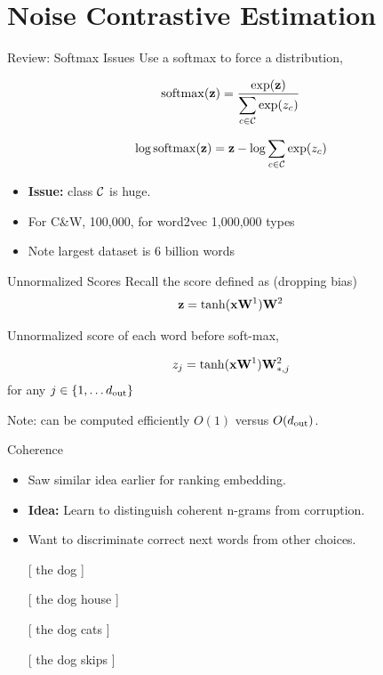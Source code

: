 \documentclass{beamer}
\begin{document}
\section{Noise Contrastive Estimation}

\begin{frame}{Review: Softmax Issues}
  Use a softmax to force a distribution,

  \[\softmax(\boldz) = \frac{\exp(\boldz)}{\displaystyle \sum_{c\in \mcC } \exp(z_c)}  \]

  \[\log \softmax(\boldz) = \boldz - \log \sum_{c\in \mcC} \exp(z_c)  \]

  \begin{itemize}
  \item \textbf{Issue:} class $\mathcal{C}$ is huge.
  \item For C\&W, 100,000, for word2vec 1,000,000 types
  \item Note largest dataset is 6 billion words
  \end{itemize}

\end{frame}



\begin{frame}{Unnormalized Scores}
  Recall the score defined as (dropping bias) 
  \[ \mathbf{z} = \tanh(\mathbf{x} \mathbf{W}^1)\mathbf{W}^2  \] 

  Unnormalized score of each word before soft-max, 

  \[ z_j = \tanh(\mathbf{x} \mathbf{W}^1)\mathbf{W}^2_{*,j}  \] 
  for any  $j \in \{1, \ldots {d_{\mathrm{out}}}\}$
  \air 

  Note: can be computed efficiently $O(1)$ versus $O({d_{\mathrm{out}}})$. 
\end{frame}


\begin{frame}{Coherence }
  \begin{itemize}
  \item Saw similar idea earlier for ranking embedding. 
    \air 

  \item \textbf{Idea:} Learn to distinguish coherent n-grams from 
    corruption. 
    \air 
 

    \air
  \item Want to discriminate correct next words from other choices.

    \begin{center}
      [ the dog  ]
    \end{center}
    
    
    

    \begin {center}
      [ the dog \alert{house}  ]
      
      [ the dog \alert{cats}  ]
      
      [ the dog \alert{skips}  ]
      
    \end{center}
  \end{itemize}
\end{frame}
\end{document}
